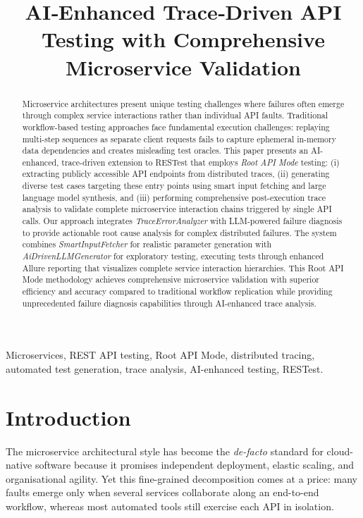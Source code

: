 \documentclass[conference]{IEEEtran}
\title{AI‑Enhanced Trace‑Driven API Testing with Comprehensive Microservice Validation}
\author{\IEEEauthorblockN{Tingshuo Miao}\IEEEauthorblockA{Department of Computer Science\\Baylor University, USA\\Email: tingshuo\_miao2@baylor.edu}}
\begin{document}
\maketitle

\begin{abstract}
Microservice architectures present unique testing challenges where failures often emerge through complex service interactions rather than individual API faults. Traditional workflow-based testing approaches face fundamental execution challenges: replaying multi-step sequences as separate client requests fails to capture ephemeral in-memory data dependencies and creates misleading test oracles. This paper presents an AI-enhanced, trace-driven extension to RESTest that employs \emph{Root API Mode} testing: (i) extracting publicly accessible API endpoints from distributed traces, (ii) generating diverse test cases targeting these entry points using smart input fetching and large language model synthesis, and (iii) performing comprehensive post-execution trace analysis to validate complete microservice interaction chains triggered by single API calls. Our approach integrates \textit{TraceErrorAnalyzer} with LLM-powered failure diagnosis to provide actionable root cause analysis for complex distributed failures. The system combines \textit{SmartInputFetcher} for realistic parameter generation with \textit{AiDrivenLLMGenerator} for exploratory testing, executing tests through enhanced Allure reporting that visualizes complete service interaction hierarchies. This Root API Mode methodology achieves comprehensive microservice validation with superior efficiency and accuracy compared to traditional workflow replication while providing unprecedented failure diagnosis capabilities through AI-enhanced trace analysis.
\end{abstract}

\begin{IEEEkeywords}
Microservices, REST API testing, Root API Mode, distributed tracing, automated test generation, trace analysis, AI-enhanced testing, RESTest.
\end{IEEEkeywords}

\section{Introduction}
The microservice architectural style has become the \emph{de-facto}
standard for cloud-native software because it promises independent
deployment, elastic scaling, and organisational agility.  Yet this
fine-grained decomposition comes at a price: many faults emerge only
when several services collaborate along an end-to-end workflow, whereas
most automated tools still exercise each API in isolation.
\end{document}
